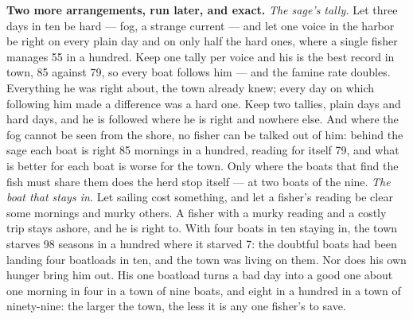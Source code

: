 \textbf{Two more arrangements, run later, and exact.} \emph{The sage's tally.}
Let three days in ten be hard --- fog, a strange current --- and let one
voice in the harbor be right on every plain day and on only half the
hard ones, where a single fisher manages 55 in a hundred. Keep one
tally per voice and his is the best record in town, 85 against 79, so
every boat follows him --- and the famine rate doubles. Everything he
was right about, the town already knew; every day on which following
him made a difference was a hard one. Keep two tallies, plain days and
hard days, and he is followed where he is right and nowhere else. And
where the fog cannot be seen from the shore, no fisher can be talked
out of him: behind the sage each boat is right 85 mornings in a
hundred, reading for itself 79, and what is better for each boat is
worse for the town. Only where the boats that find the fish must share
them does the herd stop itself --- at two boats of the nine.
\emph{The boat that stays in.} Let sailing cost something, and let a
fisher's reading be clear some mornings and murky others. A fisher
with a murky reading and a costly trip stays ashore, and he is right
to. With four boats in ten staying in, the town starves 98 seasons in
a hundred where it starved 7: the doubtful boats had been landing four
boatloads in ten, and the town was living on them. Nor does his own
hunger bring him out. His one boatload turns a bad day into a good one
about one morning in four in a town of nine boats, and eight in a
hundred in a town of ninety-nine: the larger the town, the less it is
any one fisher's to save.


